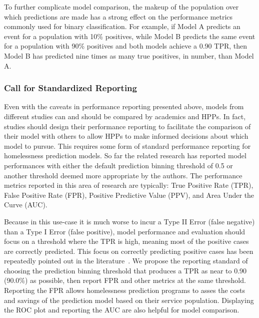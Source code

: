 \documentclass[10pt,letterpaper]{article}
\newcommand{\red}[1]{{\color{red}{#1}}}
\begin{document}
To further complicate model comparison, the makeup of the population over which predictions are made has a strong effect on the performance metrics commonly used for binary classification. For example, if Model A predicts an event for a population with 10\% positives, while Model B predicts the same event for a population with 90\% positives and both models achieve a 0.90 TPR, then Model B has predicted nine times as many true positives, in number, than Model A. \red{REMOVE THIS PARAGRAPH?}

\subsubsection*{Call for Standardized Reporting}
Even with the caveats in performance reporting presented above, models from different studies can and should be compared by academics and HPPs. In fact, studies should design their performance reporting to facilitate the comparison of their model with others to allow HPPs to make informed decisions about which model to pursue. This requires some form of standard performance reporting for homelessness prediction models. So far the related research has reported model performances with either the default prediction binning threshold of 0.5 or another threshold deemed more appropriate by the authors. The performance metrics reported in this area of research are typically: True Positive Rate (TPR), False Positive Rate (FPR), Positive Predictive Value (PPV), and Area Under the Curve (AUC). 

Because in this use-case it is much worse to incur a Type II Error (false negative) than a Type I Error (false positive), model performance and evaluation should focus on a threshold where the TPR is high, meaning most of the positive cases are correctly predicted. This focus on correctly predicting positive cases has been repeatedly pointed out in the literature~\cite{vanberlo2021interpretable,hong2018applications}. We propose the reporting standard of choosing the prediction binning threshold that produces a TPR as near to 0.90 (90.0\%) as possible, then report FPR and other metrics at the same threshold. Reporting the FPR allows homelessness prediction programs to asses the costs and savings of the prediction model based on their service population. Displaying the ROC plot and reporting the AUC are also helpful for model comparison. 
\end{document}
